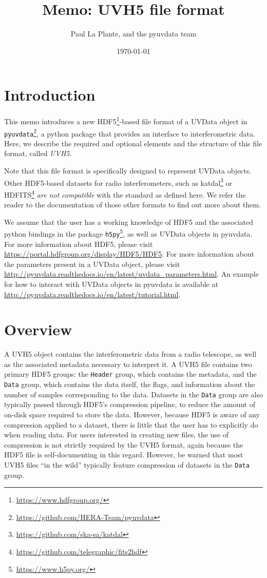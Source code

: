 \documentclass[11pt, oneside]{article}
\title{Memo: UVH5 file format}
\author{Paul La Plante, and the pyuvdata team}
\date{\today}
\begin{document}
\maketitle
\tableofcontents
\section{Introduction}
\label{sec:intro}
This memo introduces a new HDF5\footnote{\url{https://www.hdfgroup.org/}}-based
file format of a UVData object in
\verb+pyuvdata+\footnote{\url{https://github.com/HERA-Team/pyuvdata}}, a python
package that provides an interface to interferometric data. Here, we describe
the required and optional elements and the structure of this file format, called
\textit{UVH5}.

Note that this file format is specifically designed to represent UVData
objects. Other HDF5-based datasets for radio interferometers, such as
katdal\footnote{\url{https://github.com/ska-sa/katdal}} or
HDFITS\footnote{\url{https://github.com/telegraphic/fits2hdf}} \textit{are not
  compatible} with the standard as defined here. We refer the reader to the
documentation of those other formats to find out more about them.

We assume that the user has a working knowledge of HDF5 and the associated
python bindings in the package \verb+h5py+\footnote{\url{https://www.h5py.org/}}, as
well as UVData objects in pyuvdata. For more information about HDF5, please
visit \url{https://portal.hdfgroup.org/display/HDF5/HDF5}. For more information
about the parameters present in a UVData object, please visit
\url{http://pyuvdata.readthedocs.io/en/latest/uvdata_parameters.html}. An
example for how to interact with UVData objects in pyuvdata is available at
\url{http://pyuvdata.readthedocs.io/en/latest/tutorial.html}.

\section{Overview}
\label{sec:overview}
A UVH5 object contains the interferometric data from a radio telescope, as well
as the associated metadata necessary to interpret it. A UVH5 file contains two
primary HDF5 groups: the \verb+Header+ group, which contains the metadata, and
the \verb+Data+ group, which contains the data itself, the flags, and
information about the number of samples corresponding to the data. Datasets in
the \verb+Data+ group are also typically passed through HDF5's compression
pipeline, to reduce the amount of on-disk space required to store the data.
However, because HDF5 is aware of any compression applied to a dataset, there is
little that the user has to explicitly do when reading data. For users
interested in creating new files, the use of compression is not strictly
required by the UVH5 format, again because the HDF5 file is self-documenting in
this regard. However, be warned that most UVH5 files ``in the wild'' typically
feature compression of datasets in the \verb+Data+ group.
\end{document}
